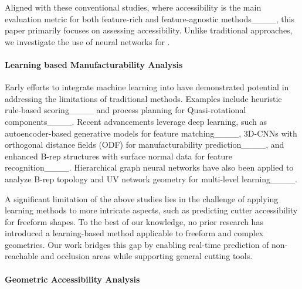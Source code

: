 
Aligned with these conventional studies, where accessibility is the main evaluation metric for both feature-rich and feature-agnostic methods____, this paper primarily focuses on assessing accessibility.
Unlike traditional approaches, we investigate the use of neural networks for \accessAna. 


\paragraph{Learning based Manufacturability Analysis}

Early efforts to integrate machine learning into \manuAna have demonstrated potential in addressing the limitations of traditional methods. Examples include heuristic rule-based scoring____ and process planning for Quasi-rotational components____. Recent advancements leverage deep learning, such as autoencoder-based generative models for feature matching____, 3D-CNNs with orthogonal distance fields (ODF) for manufacturability prediction____, and enhanced B-rep structures with surface normal data for feature recognition____. Hierarchical graph neural networks have also been applied to analyze B-rep topology and UV network geometry for multi-level learning____.


A significant limitation of the above studies lies in the challenge of applying learning methods to more intricate aspects, such as predicting cutter accessibility for freeform shapes.
To the best of our knowledge, no prior research has introduced a learning-based \accessAna method applicable to freeform and complex geometries. Our work bridges this gap by enabling real-time prediction of non-reachable and occlusion areas while supporting general cutting tools.


\paragraph{Geometric Accessibility Analysis}


